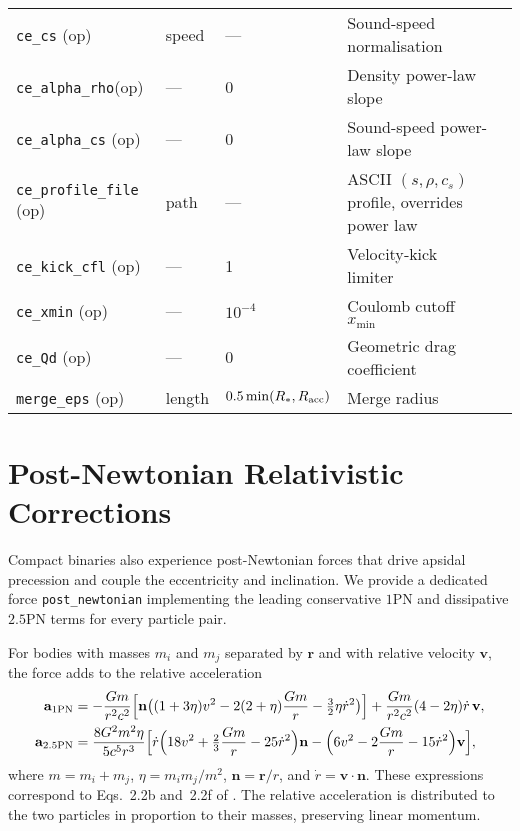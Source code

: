 \documentclass[11pt]{article}
\begin{document}
\begin{table}[h]
\begin{tabular}{@{}lllll@{}}
\texttt{ce\_cs}         (op) & speed   & — & Sound-speed normalisation\\
\texttt{ce\_alpha\_rho}(op) & —       & 0 & Density power-law slope\\
\texttt{ce\_alpha\_cs} (op) & —       & 0 & Sound-speed power-law slope\\
\texttt{ce\_profile\_file}  (op) & path & — & ASCII $(s,\rho,c_s)$ profile, overrides power law\\
\texttt{ce\_kick\_cfl}      (op) & — & 1 & Velocity‑kick limiter\\
\texttt{ce\_xmin}           (op) & — & $10^{-4}$ & Coulomb cutoff $x_{\min}$\\
\texttt{ce\_Qd}             (op) & — & 0 & Geometric drag coefficient\\[0.2em]
\texttt{merge\_eps}         (op) & length & $0.5\min(R_*,R_{\rm acc})$ & Merge radius\\
\bottomrule
\end{tabular}
\end{table}

\section{Post-Newtonian Relativistic Corrections}
Compact binaries also experience post-Newtonian forces that drive apsidal
precession and couple the eccentricity and inclination. We provide a dedicated
force \texttt{post\_newtonian} implementing the leading conservative $1$PN and
dissipative $2.5$PN terms for every particle pair.

For bodies with masses $m_i$ and $m_j$ separated by $\mathbf{r}$ and with
relative velocity $\mathbf{v}$, the force adds to the relative acceleration
\begin{align}
\mathbf{a}_{1\mathrm{PN}} &= -\frac{G m}{r^2 c^2}
   \Bigl[\mathbf{n}\bigl((1+3\eta)v^2 - 2(2+\eta)\frac{G m}{r}-\tfrac{3}{2}\eta\dot r^2\bigr)\Bigr]
   +\frac{G m}{r^2 c^2}(4-2\eta)\dot r\,\mathbf{v},\\
\mathbf{a}_{2.5\mathrm{PN}} &= \frac{8 G^2 m^2 \eta}{5 c^5 r^3}\Bigl[\dot r\Bigl(18 v^2 + \tfrac{2}{3}\frac{G m}{r}-25\dot r^2\Bigr)\mathbf{n}-\Bigl(6 v^2 - 2\frac{G m}{r}-15\dot r^2\Bigr)\mathbf{v}\Bigr],
\end{align}
where $m=m_i+m_j$, $\eta=m_i m_j/m^2$, $\mathbf{n}=\mathbf{r}/r$, and
$\dot r = \mathbf{v}\cdot\mathbf{n}$. These expressions correspond to
Eqs.~2.2b and~2.2f of \citet{Kidder1995}. The relative acceleration is
distributed to the two particles in proportion to their masses, preserving
linear momentum.
\end{document}
